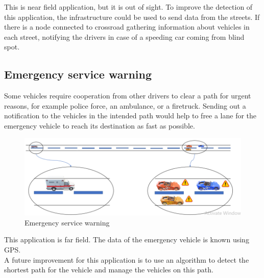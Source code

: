 This is near field application, but it is out of sight. To improve the detection of this application, the infrastructure could be used to send data from the streets. If there is a node connected to crossroad gathering information about vehicles in each street, notifying the drivers in case of a speeding car coming from blind spot.
\\

\subsection{Emergency service warning}

Some vehicles require cooperation from other drivers to clear a path for urgent reasons, for example police force, an ambulance, or a firetruck. Sending out a notification to the vehicles in the intended path would help to free a lane for the emergency vehicle to reach its destination as fast as possible.\\

\begin{figure}[h]
    \centering
    \includegraphics[scale=.5]{figure10/4.png}
    \caption{Emergency service warning}
\end{figure}

This application is far field. The data of the emergency vehicle is known using GPS.\\
A future improvement for this application is to use an algorithm to detect the shortest path for the vehicle and manage the vehicles on this path.

